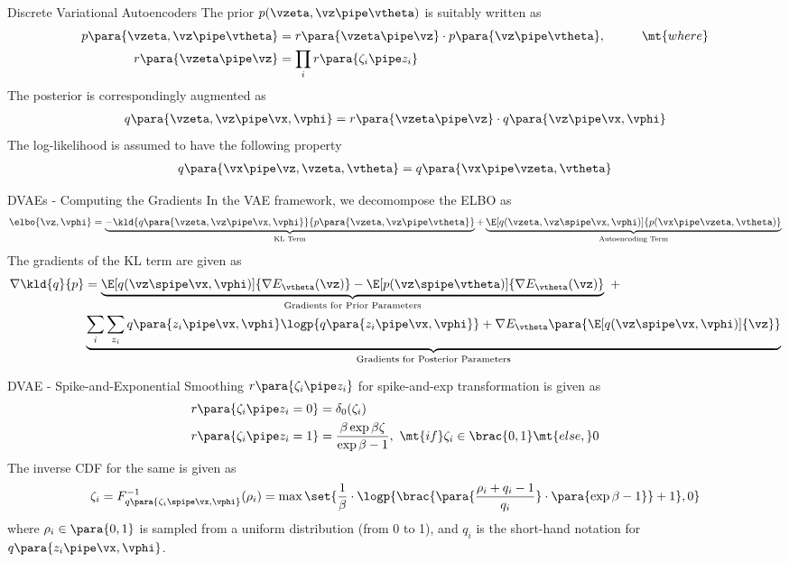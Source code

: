 \documentclass[9pt]{beamer}
\newcommand{\pp}{p\para}
\newcommand{\qp}{q\para}
\newcommand{\rp}{r\para}
\begin{document}
\begin{frame}{Discrete Variational Autoencoders}
	The prior $p(\vzeta, \vz \pipe \vtheta)$ is suitably written as
	\begin{align*}
		\pp{\vzeta, \vz \pipe \vtheta}	&= r\para{\vzeta \pipe \vz} \cdot \pp{\vz \pipe \vtheta}, \hspace{1cm} \mt{where} \\
		r\para{\vzeta \pipe \vz}			&= \prod_i r\para{\zeta_i \pipe z_i}
	\end{align*}
	The posterior is correspondingly augmented as
	\begin{align*}
		\qp{\vzeta, \vz \pipe \vx, \vphi} = \rp{\vzeta \pipe \vz} \cdot \qp{\vz \pipe \vx, \vphi}
	\end{align*}
	The log-likelihood is assumed to have the following property
	\begin{align*}
		\qp{\vx \pipe \vz, \vzeta, \vtheta} = \qp{\vx \pipe \vzeta, \vtheta}
	\end{align*}
\end{frame}

\begin{frame}{DVAEs - Computing the Gradients}
	In the VAE framework, we decomompose the ELBO as
	\begin{align*}
		\elbo{\vz, \vphi} = \underbrace{- \kld{\qp{\vzeta, \vz \pipe \vx, \vphi}}{\pp{\vzeta, \vz \pipe \vtheta}}}_\text{KL Term} + \underbrace{\E[q(\vzeta, \vz \spipe \vx, \vphi)]{p(\vx \pipe \vzeta, \vtheta)}}_\text{Autoencoding Term}
	\end{align*}
	The gradients of the KL term are given as
	\begin{align*}
		\nabla \kld{q}{p} &= \underbrace{\E[q(\vz \spipe \vx, \vphi)]{\nabla E_\vtheta(\vz)} - \E[p(\vz \spipe \vtheta)]{\nabla E_\vtheta(\vz)}}_\text{Gradients for Prior Parameters} \ + \\
		& \underbrace{\sum_{i} \sum_{z_i} \qp{z_i \pipe \vx, \vphi} \logp{\qp{z_i \pipe \vx, \vphi}} + \nabla E_\vtheta\para{\E[q(\vz \spipe \vx, \vphi)]{\vz}}}_\text{Gradients for Posterior Parameters}
	\end{align*}
\end{frame}

\begin{frame}{DVAE - Spike-and-Exponential Smoothing}
	$\rp{\zeta_i \pipe z_i}$ for spike-and-exp transformation is given as
	\begin{align*}
		\rp{\zeta_i \pipe z_i = 0}	&= \delta_{0}(\zeta_i) \\
		\rp{\zeta_i \pipe z_i = 1}	&= \frac{\beta \exp{\beta \zeta}}{\exp{\beta} - 1},	\ \mt{if} \zeta_i \in \brac{0, 1} \mt{else,} 0
	\end{align*}
	The inverse CDF for the same is given as
	\begin{align*}
		\zeta_i = F_{\qp{\zeta_i \spipe \vx, \vphi}}^{-1}(\rho_i)	= \max\set{\frac{1}{\beta} \cdot \logp{\brac{\para{\frac{\rho_i + q_i - 1}{q_i}} \cdot \para{\exp{\beta} - 1}} + 1}, 0}
	\end{align*}
	where $\rho_i \in \para{0, 1}$ is sampled from a uniform distribution (from 0 to 1), and $q_i$ is the short-hand notation for $\qp{z_i \pipe \vx, \vphi}$.

\end{frame}
\end{document}
